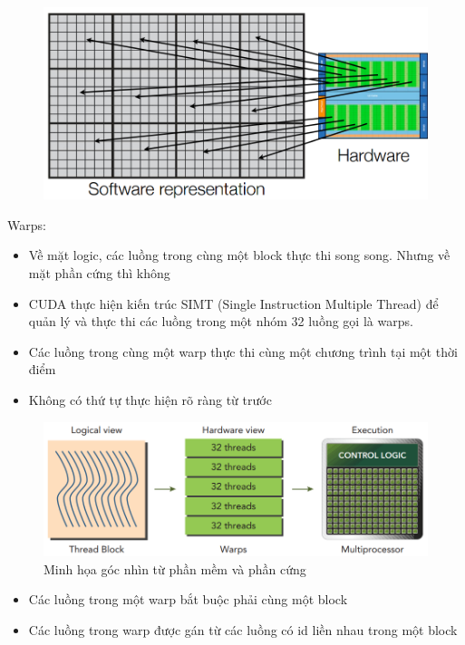 \documentclass[14pt, a4paper]{article}
\numberwithin{equation}{section}
\numberwithin{figure}{section}
\numberwithin{dl}{section}
\numberwithin{md}{section}
\numberwithin{bd}{section}
\numberwithin{dn}{section}
\numberwithin{hq}{section}
\begin{document}
\begin{figure}[H]
    \centering
    \includegraphics[width=0.85\linewidth]{figures/CUDA/Connecting_SW_HW_2.png}
\end{figure}

Warps:

\begin{itemize}
    \item Về mặt logic, các luồng trong cùng một block thực thi song song. Nhưng về mặt phần cứng thì không
    \item CUDA thực hiện kiến trúc SIMT (Single Instruction Multiple Thread) để quản lý và thực thi các luồng trong một nhóm 32 luồng gọi là warps.
    \item Các luồng trong cùng một warp thực thi cùng một chương trình tại một thời điểm
    \item Không có thứ tự thực hiện rõ ràng từ trước
\end{itemize}

\begin{figure}[H]
    \centering
    \includegraphics[width=0.7\linewidth]{figures/CUDA/Logical_view_vs_Hardware_view.png}
    \caption{Minh họa góc nhìn từ phần mềm và phần cứng}
\end{figure}

\begin{itemize}
    \item Các luồng trong một warp bắt buộc phải cùng một block 
    \item Các luồng trong warp được gán từ các luồng có id liền nhau trong một block 
\end{itemize}
\end{document}

